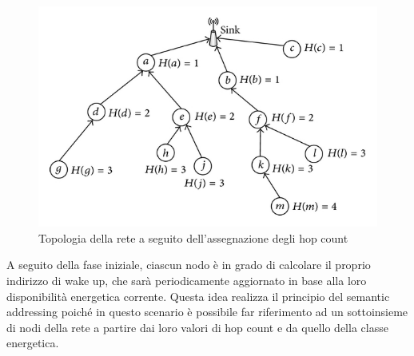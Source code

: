\documentclass{report}
\begin{document}
\begin{figure}
    \begin{center}
        \includegraphics[scale=1.7]{hop-count-algorithm.png}
        \caption{Topologia della rete a seguito dell'assegnazione degli hop count}
    \end{center}
\end{figure}

A seguito della fase iniziale, ciascun nodo è in grado di calcolare il proprio indirizzo di wake up, che sarà periodicamente aggiornato in base alla loro
disponibilità energetica corrente. Questa idea realizza il principio del semantic addressing poiché in questo scenario
è possibile far riferimento ad un sottoinsieme di nodi della rete a partire dai loro valori di hop count e da quello della classe energetica.\\
\end{document}
